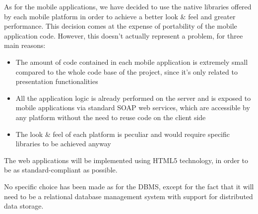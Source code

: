 As for the mobile applications, we have decided to use the native libraries offered by each mobile platform in order to achieve a better look \& feel and greater performance. This decision comes at the expense of portability of the mobile application code. However, this doesn't actually represent a problem, for three main reasons:
\begin{itemize}
	\item The amount of code contained in each mobile application is extremely small compared to the whole code base of the project, since it's only related to presentation functionalities
	\item All the application logic is already performed on the server and is exposed to mobile applications via standard SOAP web services, which are accessible by any platform without the need to reuse code on the client side
	\item The look \& feel of each platform is peculiar and would require specific libraries to be achieved anyway 
\end{itemize}

The web applications will be implemented using HTML5 technology, in order to be as standard-compliant as possible.

No specific choice has been made as for the DBMS, except for the fact that it will need to be a relational database management system with support for distributed data storage.